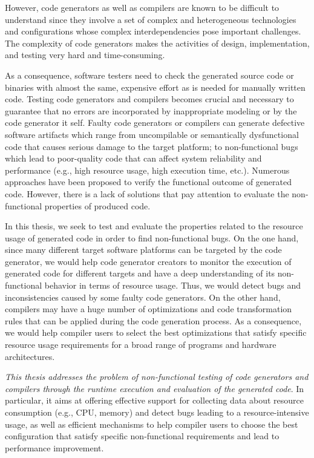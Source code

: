 However, code generators as well as compilers are known to be difficult to understand since they involve a set of complex and heterogeneous technologies and configurations whose complex interdependencies pose important challenges. The complexity of code generators makes the activities of design, implementation, and testing very hard and time-consuming\cite{guana2015developers}. 

As a consequence, software testers need to check the generated source code or binaries with almost the same, expensive effort as is needed for manually written code. 
Testing code generators and compilers becomes crucial and necessary to guarantee that no errors are incorporated by inappropriate modeling or by the code generator it self. 
Faulty code generators or compilers can generate defective software artifacts which range from uncompilable or semantically dysfunctional code that causes serious damage to the target platform; to non-functional bugs which lead to poor-quality code that can affect system reliability and performance (e.g., high resource usage, high execution time, etc.). 
Numerous approaches have been proposed\cite{stuermer2007systematic,yang2011finding} to verify the functional outcome of generated code. However, there is a lack of solutions that pay attention to evaluate the non-functional properties of produced code.

In this thesis, we seek to test and evaluate the properties related to the resource usage of generated code in order to find non-functional bugs. 
On the one hand, since many different target software platforms can be targeted by the code generator, we would help code generator creators to monitor the execution of generated code for different targets and have a deep understanding of its non-functional behavior in terms of resource usage. Thus, we would detect bugs and inconsistencies caused by some faulty code generators. 
On the other hand, compilers may have a huge number of optimizations and code transformation rules that can be applied during the code generation process. As a consequence, we would help compiler users to select the best optimizations that satisfy specific resource usage requirements for a broad range of programs and hardware architectures.

\textit{This thesis addresses the problem of non-functional testing of code generators and compilers through the runtime execution and evaluation of the generated code}. In particular, it aims at offering effective support for collecting data about resource consumption (e.g., CPU, memory) and detect bugs leading to a resource-intensive usage, as well as efficient mechanisms to help compiler users to choose the best configuration that satisfy specific non-functional requirements and lead to performance improvement.


